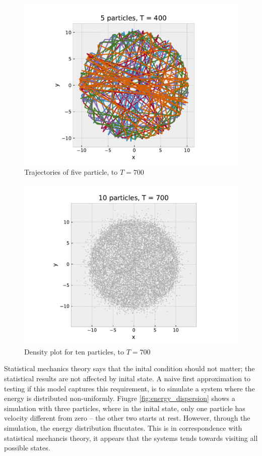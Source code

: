 \documentclass[a4paper,12pt]{article}
\begin{document}
\begin{figure}[hp]
  \centering
  \includegraphics[width=.75\textwidth]{media/trajectory_five_particles}
  \caption{Trajectories of five particle, to $T=700$\label{fig:traj_five}}
\end{figure}

\begin{figure}[htp]
  \centering
  \includegraphics[width=.75\textwidth]{media/trajectory_ten_particles}
  \caption{Density plot for ten particles, to $T=700$\label{fig:traj_multiple}}
\end{figure}


Statistical mechanics theory says that the inital condition should not matter; the statistical results are not affected by inital state.
A naive first approximation to testing if this model captures this requirement, is to simulate a system where the energy is distributed non-uniformly.
Fiugre \ref{fig:energy_dispersion} shows a simulation with three particles, where in the inital state, only one particle has velocity different from zero -- the other two starts at rest.
However, through the simulation, the energy distribution flucutates.
This is in correspondence with statistical mechancis theory, it appears that the systems tends towards visiting all possible states.
\end{document}
